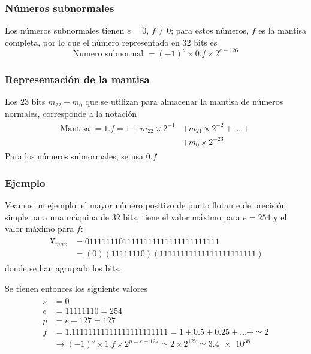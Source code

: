 \begin{frame}
\frametitle{Números subnormales}
Los números subnormales tienen $e=0$, $f \neq 0$; para estos números, $f$ es la mantisa completa, por lo que el número representado en 32 bits es
\begin{equation}
\text{Numero subnormal } = (-1)^{s} \times 0.f \times 2^{e-126}
\label{eq:ecuacion_01_04}
\end{equation}
\end{frame}
\begin{frame}
\frametitle{Representación de la mantisa}
Los $23$ bits $m_{22} - m_{0}$ que se utilizan para almacenar la mantisa de números normales, corresponde a la notación
\begin{align}
\begin{aligned}
\text{Mantisa } = 1.f = 1 + m_{22} \times 2^{-1} &+ m_{21} \times 2^{-2} + \ldots + \\
&+ m_{0} \times 2^{-23}
\end{aligned}
\label{eq:ecuacion_01_05}
\end{align}
\pause
Para los números subnormales, se usa $0.f$
\end{frame}
\begin{frame}
\frametitle{Ejemplo}
Veamos un ejemplo: el mayor número positivo de punto flotante de precisión simple para una máquina de $32$ bits, tiene el valor máximo para $e = 254$ y el valor máximo para $f$:
\fontsize{12}{12}\selectfont
\begin{align}
\begin{aligned}
X_{max} &= 01111 1110 1111 1111 1111 1111 1111 111 \\
&=(0)(1111 1110)(1111 1111 1111 1111 1111 111)
\end{aligned}
\label{eq:ecuacion_01_06}
\end{align}
donde se han agrupado los bits.
\end{frame}
\begin{frame}
Se tienen entonces los siguiente valores
\begin{align}
\begin{aligned}
s &= 0 \\
e &= 1111 1110 = 254 \\
p &= e - 127 = 127 \\
f &= 1.1111 1111 1111 1111 1111 111 = 1 + 0.5 + 0.25 + \ldots + \simeq 2 \\
&\rightarrow (-1)^{s} \times 1.f \times 2^{p=e-127} \simeq 2 \times 2^{127} \simeq \num{3.4e38}
\end{aligned}
\label{eq:ecuacion_01_07}
\end{align}
\end{frame}
